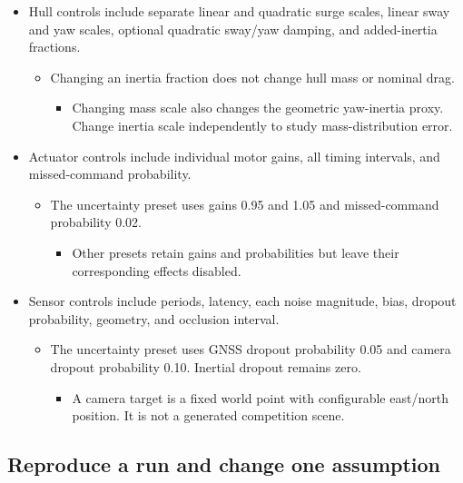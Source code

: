 \documentclass[10pt,letterpaper]{article}
\begin{document}
\begin{itemize}
\item
  Hull controls include separate linear and quadratic surge scales, linear sway and yaw scales, optional quadratic sway/yaw damping, and added-inertia fractions.

  \begin{itemize}
  \item
    Changing an inertia fraction does not change hull mass or nominal drag.

    \begin{itemize}
    \item
      Changing mass scale also changes the geometric yaw-inertia proxy. Change inertia scale independently to study mass-distribution error.
    \end{itemize}
  \end{itemize}
\item
  Actuator controls include individual motor gains, all timing intervals, and missed-command probability.

  \begin{itemize}
  \item
    The uncertainty preset uses gains 0.95 and 1.05 and missed-command probability 0.02.

    \begin{itemize}
    \item
      Other presets retain gains and probabilities but leave their corresponding effects disabled.
    \end{itemize}
  \end{itemize}
\item
  Sensor controls include periods, latency, each noise magnitude, bias, dropout probability, geometry, and occlusion interval.

  \begin{itemize}
  \item
    The uncertainty preset uses GNSS dropout probability 0.05 and camera dropout probability 0.10. Inertial dropout remains zero.

    \begin{itemize}
    \item
      A camera target is a fixed world point with configurable east/north position. It is not a generated competition scene.
    \end{itemize}
  \end{itemize}
\end{itemize}

\subsection{Reproduce a run and change one assumption}
\end{document}
